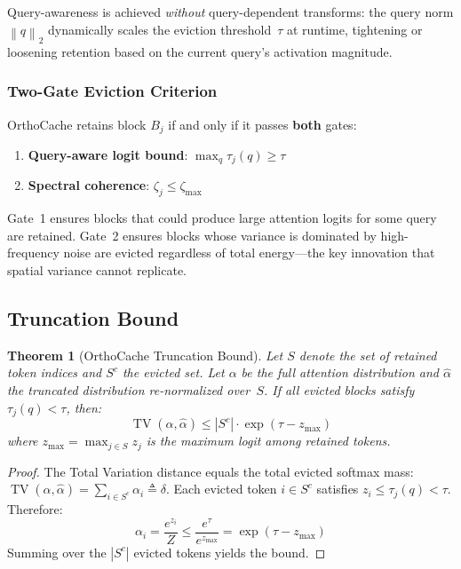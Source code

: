 \documentclass[conference,10pt]{IEEEtran}
\newtheorem{theorem}{Theorem}
\DeclareMathOperator{\TV}{TV}
\newcommand{\norm}[1]{\left\|#1\right\|}
\begin{document}
Query-awareness is achieved \emph{without} query-dependent transforms: the
query norm $\norm{q}_2$ dynamically scales the eviction threshold~$\tau$ at
runtime, tightening or loosening retention based on the current query's
activation magnitude.

\subsubsection{Two-Gate Eviction Criterion}

OrthoCache retains block $B_j$ if and only if it passes \textbf{both} gates:
\begin{enumerate}
    \item \textbf{Query-aware logit bound}: $\max_q \tau_j(q) \geq \tau$
    \item \textbf{Spectral coherence}: $\zeta_j \leq \zeta_{\max}$
\end{enumerate}

Gate~1 ensures blocks that could produce large attention logits for some query
are retained. Gate~2 ensures blocks whose variance is dominated by
high-frequency noise are evicted regardless of total energy---the key
innovation that spatial variance cannot replicate.

\subsection{Truncation Bound}\label{sec:bound}

\begin{theorem}[OrthoCache Truncation Bound]\label{thm:tv}
    Let $S$ denote the set of retained token indices and $S^c$ the evicted set.
    Let $\alpha$ be the full attention distribution and $\hat{\alpha}$ the
    truncated distribution re-normalized over~$S$. If all evicted blocks satisfy
    $\tau_j(q) < \tau$, then:
    \begin{equation}\label{eq:tv_bound}
        \TV(\alpha, \hat{\alpha}) \leq |S^c| \cdot \exp(\tau - z_{\max})
    \end{equation}
    where $z_{\max} = \max_{j \in S} z_j$ is the maximum logit among retained
    tokens.
\end{theorem}

\begin{proof}
    The Total Variation distance equals the total evicted softmax mass:
    $\TV(\alpha, \hat{\alpha}) = \sum_{i \in S^c} \alpha_i \triangleq \delta$.
    Each evicted token $i \in S^c$ satisfies $z_i \leq \tau_j(q) < \tau$.
    Therefore:
    \begin{equation}
        \alpha_i = \frac{e^{z_i}}{Z} \leq \frac{e^{\tau}}{e^{z_{\max}}}
                 = \exp(\tau - z_{\max})
    \end{equation}
    Summing over the $|S^c|$ evicted tokens yields the bound.
\end{proof}
\end{document}
